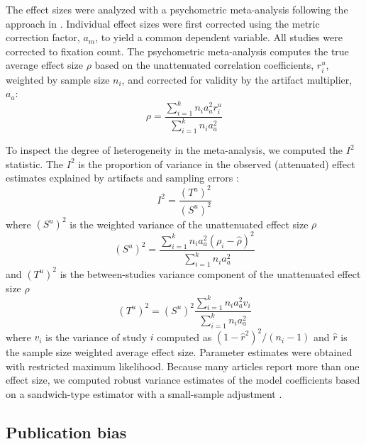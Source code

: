 The effect sizes were analyzed with a psychometric meta-analysis following the approach in \cite{hunter2004a}. Individual effect sizes were first corrected using the metric correction factor, $a_m$, to yield a common dependent variable. All studies were corrected to fixation count. The psychometric meta-analysis computes the true average effect size $\rho$ based on the unattenuated correlation coefficients, $r_i^u$, weighted by sample size $n_i$, and corrected for validity by the artifact multiplier, $a_a$: 
%
\begin{equation}
\label{eq:psychometric_rho}
\rho = \frac{\sum_{i=1}^k n_i a_a^2 r_i^u}{\sum_{i=1}^k n_i a_a^2}
\end{equation}

To inspect the degree of heterogeneity in the meta-analysis, we computed the $I^2$ statistic. The $I^2$ is the proportion of variance in the observed (attenuated) effect estimates explained by artifacts and sampling errors \citep{borenstein2011introduction}: 
%
\begin{equation}
\label{eq:i2_statistic}
I^2 = \frac{(T^u)^2}{(S^u)^2}
\end{equation}
%
where $(S^u)^2$ is the weighted variance of the unattenuated effect size $\rho$
%
\begin{equation}
\label{eq:Su2_var}
(S^u)^2 = \frac{\sum_{i=1}^k n_i a_a^2 (\rho_i - \hat{\rho})^2}{\sum_{i=1}^k n_i a_a^2}
\end{equation}
%
and $(T^u)^2$ is the between-studies variance component of the unattenuated effect size $\rho$
%
\begin{equation}
\label{eq:Tu2_var}
(T^u)^2 = (S^u)^2 \frac{\sum_{i=1}^k n_i a_a^2 v_i}{\sum_{i=1}^k n_i a_a^2}
\end{equation}
%
where $v_i$ is the variance of study $i$ computed as $(1 - \hat{r}^2)^2 / (n_i - 1)$ and $\hat{r}$ is the sample size weighted average effect size. Parameter estimates were obtained with restricted maximum likelihood. Because many articles report more than one effect size, we computed robust variance estimates of the model coefficients based on a sandwich-type estimator with a small-sample adjustment \citep{hedges2010}.


\subsection{Publication bias}

